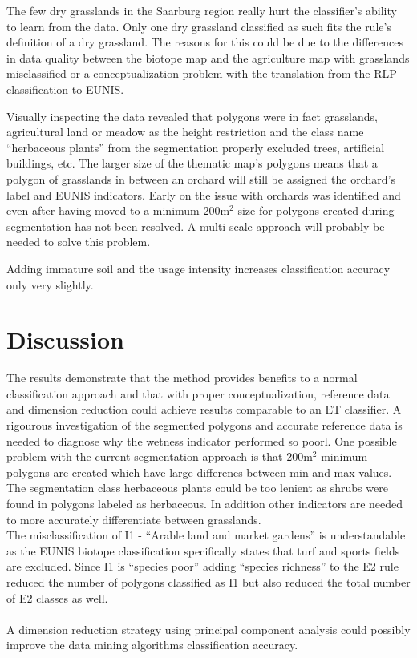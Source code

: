 \documentclass[authoryear, review,12pt,number]{elsarticle}
\begin{document}
The few dry grasslands in the Saarburg region really hurt the classifier's 
ability to learn from the data. Only one dry grassland classified as such fits 
the rule's definition of a dry grassland. The reasons for this could be due to 
the differences in data quality between the biotope map and the agriculture map 
with grasslands misclassified or a conceptualization problem with the 
translation from the RLP classification to EUNIS. 

Visually inspecting the data revealed that polygons were in fact grasslands, 
agricultural land or meadow as the height restriction and the class name 
``herbaceous plants'' from the segmentation properly excluded trees, artificial 
buildings, etc. The larger size of the thematic map's 
polygons means that a polygon of grasslands in between an orchard will still be 
assigned the orchard's label and EUNIS indicators. Early on the issue with
orchards was identified and even after having moved to a minimum 200m$^{2}$ size for
polygons created during segmentation has not been resolved. A multi-scale
approach will probably be needed to solve this problem.

Adding immature soil and the usage intensity increases classification accuracy 
only very slightly.

\section{Discussion}
The results demonstrate that the method provides benefits to a normal
classification approach and that with proper conceptualization, reference data
and dimension reduction could achieve results comparable to an ET classifier. A
rigourous investigation of the segmented polygons and accurate reference data is
needed to diagnose why the wetness indicator performed so poorl. One possible
problem with the current segmentation approach is that 200m$^{2}$ minimum
polygons are created which have large differenes between min and max values. The
segmentation class herbaceous plants could be too lenient as shrubs were found
in polygons labeled as herbaceous. In addition other indicators are needed to
more accurately differentiate between grasslands.
\\
The misclassification of I1 - ``Arable land and market gardens'' is 
understandable as the EUNIS biotope classification specifically states that 
turf and sports fields are excluded. Since I1 is ``species poor'' adding 
``species richness'' to the E2 rule reduced the number of polygons classified 
as I1 but also reduced the total number of E2 classes as well.\\
\\
A dimension reduction strategy using principal component analysis could possibly
improve the data mining algorithms classification accuracy.
\end{document}
